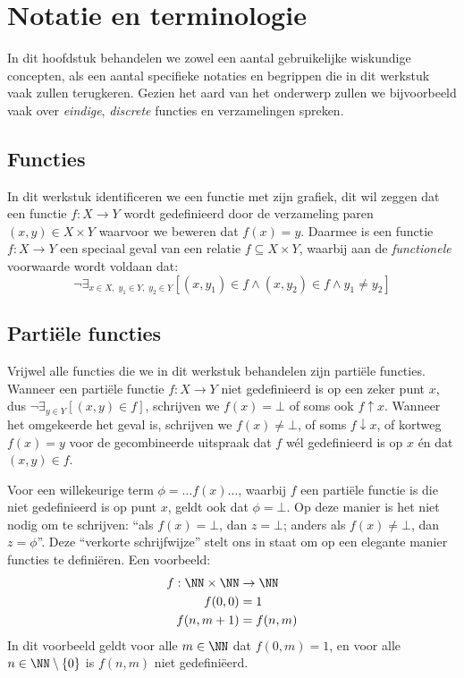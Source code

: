 \chapter{Notatie en terminologie}

In dit hoofdstuk behandelen we zowel een aantal gebruikelijke wiskundige concepten, als een aantal specifieke notaties en begrippen die in dit werkstuk vaak zullen terugkeren. Gezien het aard van het onderwerp zullen we bijvoorbeeld vaak over \emph{eindige}, \emph{discrete} functies en verzamelingen spreken.

\section{Functies}

In dit werkstuk identificeren we een functie met zijn grafiek, dit wil zeggen dat een functie $f : X \to Y$ wordt gedefinieerd door de verzameling paren $(x, y) \in X \times Y$ waarvoor we beweren dat $f(x) = y$. Daarmee is een functie $f : X \to Y$ een speciaal geval van een relatie $f \subseteq X \times Y$, waarbij aan de \emph{functionele} voorwaarde wordt voldaan dat:
%
\begin{equation*}
  \neg \exists_{x \in X,\; y_1 \in Y,\; y_2 \in Y} \left[ (x, y_1) \in f \land (x, y_2) \in f \land y_1 \neq y_2 \right]
\end{equation*}

\section{Partiële functies}

Vrijwel alle functies die we in dit werkstuk behandelen zijn partiële functies. Wanneer een partiële functie $f : X \to Y$ niet gedefinieerd is op een zeker punt $x$, dus $\neg \exists_{y \in Y} [ (x, y) \in f ]$, schrijven we $f(x) = \bot$ of soms ook $f \uparrow x$. Wanneer het omgekeerde het geval is, schrijven we $f(x) \neq \bot$, of soms $f \downarrow x$, of kortweg $f(x) = y$ voor de gecombineerde uitspraak dat $f$ wél gedefinieerd is op $x$ én dat $(x, y) \in f$.

Voor een willekeurige term $\phi = \dots f(x)\dots$, waarbij $f$ een partiële functie is die niet gedefinieerd is op punt $x$, geldt ook dat $\phi = \bot$. Op deze manier is het niet nodig om te schrijven: “als $f(x) = \bot$, dan $z = \bot$; anders als $f(x) \neq \bot$, dan $z = \phi$”. Deze “verkorte schrijfwijze” stelt ons in staat om op een elegante manier functies te definiëren. Een voorbeeld:
\begin{align*}
  f : \NN \times \NN &\to \NN \\
  f(0, 0) &= 1 \\
  f(n, m + 1) &= f(n, m)
\end{align*}
In dit voorbeeld geldt voor alle $m \in \NN$ dat $f(0, m) = 1$, en voor alle $n \in \NN \setminus \{0\}$ is $f(n, m)$ niet gedefiniëerd.

